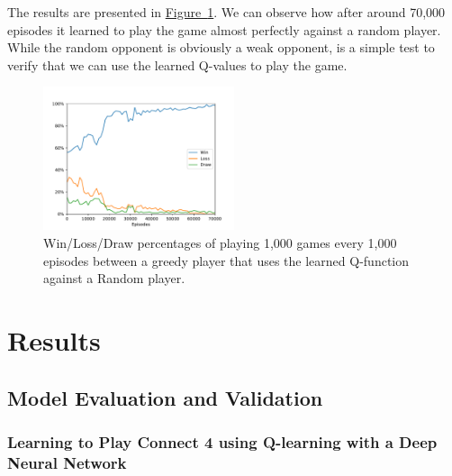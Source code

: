 \documentclass{article}
\begin{document}
The results are presented in \hyperref[fig:tic-ql-tab-full-selfplay-wld-plot]
{Figure~\ref*{fig:tic-ql-tab-full-selfplay-wld-plot}}. We can observe how after around 70,000
episodes it learned to play the game almost perfectly against a random player. While the random
opponent is obviously a weak opponent, is a simple test to verify that we can use the learned
Q-values to play the game.


\begin{figure}[!h]
    \centering
    \includegraphics[width=0.50\textwidth]{figures/tic_ql_tab_full_selfplay_wld_plot.pdf}
    \caption{Win/Loss/Draw percentages of playing 1,000 games every 1,000 episodes
             between a greedy player that uses the learned Q-function against a Random player.}
    \label{fig:tic-ql-tab-full-selfplay-wld-plot}
\end{figure}


\section{Results}

\subsection{Model Evaluation and Validation}

\subsubsection{Learning to Play Connect 4 using Q-learning with a Deep Neural Network}
\end{document}
